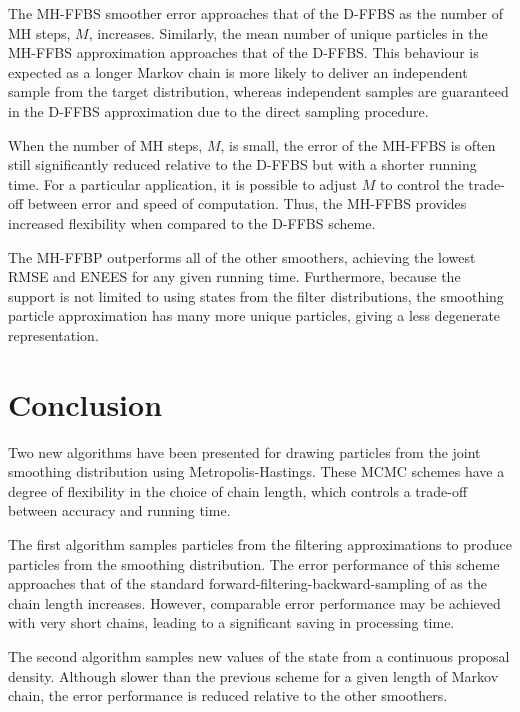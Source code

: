 \documentclass[10pt,twocolumn,twoside]{IEEEtran}
\begin{document}
The MH-FFBS smoother error approaches that of the D-FFBS as the number of MH steps, $M$, increases. Similarly, the mean number of unique particles in the MH-FFBS approximation approaches that of the D-FFBS. This behaviour is expected as a longer Markov chain is more likely to deliver an independent sample from the target distribution, whereas independent samples are guaranteed in the D-FFBS approximation due to the direct sampling procedure.

When the number of MH steps, $M$, is small, the error of the MH-FFBS is often still significantly reduced relative to the D-FFBS but with a shorter running time. For a particular application, it is possible to adjust $M$ to control the trade-off between error and speed of computation. Thus, the MH-FFBS provides increased flexibility when compared to the D-FFBS scheme.

The MH-FFBP outperforms all of the other smoothers, achieving the lowest RMSE and ENEES for any given running time. Furthermore, because the support is not limited to using states from the filter distributions, the smoothing particle approximation has many more unique particles, giving a less degenerate representation.



\section{Conclusion} \label{sec:conclusions}
Two new algorithms have been presented for drawing particles from the joint smoothing distribution using Metropolis-Hastings. These MCMC schemes have a degree of flexibility in the choice of chain length, which controls a trade-off between accuracy and running time.

The first algorithm samples particles from the filtering approximations to produce particles from the smoothing distribution. The error performance of this scheme approaches that of the standard forward-filtering-backward-sampling of \cite{Godsill2004} as the chain length increases. However, comparable error performance may be achieved with very short chains, leading to a significant saving in processing time.

The second algorithm samples new values of the state from a continuous proposal density. Although slower than the previous scheme for a given length of Markov chain, the error performance is reduced relative to the other smoothers.

\newpage

%





\end{document}
